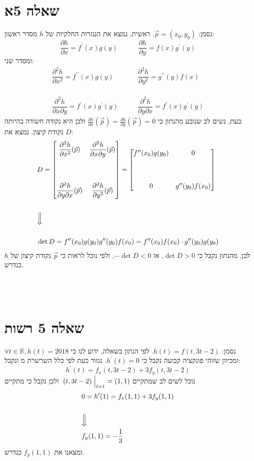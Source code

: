 \documentclass[11pt, oneside]{article}
\newcommand{\qed}{\R{$\blacksquare$}}
\newcommand{\br}{\\\\\\\\}
\newcommand{\mR}{\mathbb{R}}
\newcommand{\m}[3]{\R{משפט #3#2.#1}}
\newcommand{\evi}[3]{\eval[2]{\;#1\;}_{#3}^{#2}}
\renewcommand{\pd}[2]{\frac{\partial #1}{\partial #2}}
\newcommand{\pdt}[3]{\dfrac{\partial^{2} #1}{\partial #2 \partial #3}}
\newcommand{\pdn}[3]{\dfrac{\partial^{#3} #1}{\partial #2^{#3}}}
\begin{document}
\section*{שאלה 5א}
נסמן: $\vec{p} = (x_{0}, y_{0})$. ראשית, נמצא את הנגזרות החלקיות של $h$ מסדר ראשון:
\[
\pd{h}{x} = f^{\prime}(x)g(y)\quad\quad\quad \pd{h}{y} = f(x)g^{\prime}(y)
\]
ומסדר שני:
\[
\begin{matrix}
\pdn{h}{x}{2} = f^{\prime\prime}(x)g(y) \quad&\quad \pdn{h}{y}{2} = g^{\prime\prime}(y)f(x)\br
\pdt{h}{x}{y} = f^{\prime}(x)g^{\prime}(y) \quad&\quad \pdt{h}{y}{x} = f^{\prime}(x)g^{\prime}(y)
\end{matrix}
\]
כעת, נשים לב שנובע מהנתון כי $\pd{h}{x}(\vec{p}) = \pd{h}{y}(\vec{p}) = 0$ ולכן היא נקודה חשודה בהיותה נקודת קיצון. נמצא את $D$:
\begin{eqnarray*}
& D
= \begin{bmatrix}
\pdn{h}{x}{2}(\vec{p}) & \pdt{h}{x}{y}(\vec{p})\br
\pdt{h}{y}{x}(\vec{p}) & \pdn{h}{y}{2}(\vec{p})
\end{bmatrix}
= \begin{bmatrix}
f^{\prime\prime}(x_{0})g(y_{0}) & 0\br
0 & g^{\prime\prime}(y_{0})f(x_{0})
\end{bmatrix}\\\\
& \Big\Downarrow\\\\
& \det{D}
= f^{\prime\prime}(x_{0})g(y_{0})g^{\prime\prime}(y_{0})f(x_{0})
= f^{\prime\prime}(x_{0})f(x_{0}) \cdot g^{\prime\prime}(y_{0})g(y_{0})
\end{eqnarray*}
לכן, מהנתון נקבל כי $\det{D} > 0$, או $-\det{D} < 0$, ולפי \m{7}{27}{} נוכל לראות כי $\vec{p}$ נקודת קיצון של $h$ כנדרש.
\br\qed

\section*{שאלה 5 רשות}
נסמן: $h(t) = f(t, 3t - 2)$. לפי הנתון בשאלה, ידוע לנו כי $\forall t \in \mR, h(t) = 2018$ ומכיוון שזוהי פונקציה קבועה נקבל כי $h^{\prime}(t) = 0$. נגזור כעת לפי כלל השרשרת מ\m{7}{66}{} ונקבל:
\[
h^{\prime}(t) = f_{x}(t, 3t - 2) + 3f_{y}(t, 3t - 2)
\]
נוכל לשים לב שמתקיים $\evi{(t, 3t - 2)}{}{t=1} = (1, 1)$ ולכן נקבל כי מתקיים
\begin{eqnarray*}
&0 = h^{\prime}(1) = f_{x}(1, 1) + 3f_{y}(1, 1)\\\\
&\Big\Downarrow\\
&f_{y}(1, 1) = -\dfrac{1}{3}
\end{eqnarray*}
ומצאנו את $f_{y}(1, 1)$ כנדרש.
\br\qed
\end{document}
